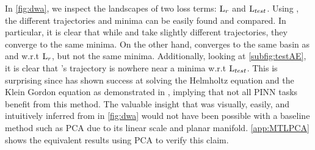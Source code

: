\documentclass[letterpaper]{article} %
\begin{document}
        In \cref{fig:dwa}, we inspect the landscapes of two loss terms: $\text{L}_{r}$ and $\text{L}_{test}$. 
        Using \proposedautencoder{}, 
        the different trajectories and minima can be easily found and compared. In particular, it is clear that while \gradnorm{} and \ew{} take slightly different trajectories, they converge to the same minima. On the other hand, \dwa{} converges to the same basin as \gradnorm{} and \ew{} w.r.t $\text{L}_{r}$, but not the same minima.  
        Additionally, looking at \cref{subfig:testAE}, it is clear that \lranneal{}'s trajectory is nowhere near a minima w.r.t $\text{L}_{test}$. This is surprising since \lranneal{} has shown success at solving the Helmholtz equation and the Klein Gordon equation as demonstrated in \cite{doi:10.1137/20M1318043}, implying that not all PINN tasks benefit from this method. %
        The valuable insight that was visually, easily, and intuitively inferred from \proposedautencoder{} in \cref{fig:dwa} would not have been possible with a baseline method such as PCA due to its linear scale and planar manifold. \cref{app:MTLPCA} shows the equivalent results using PCA to verify this claim. 
        
\end{document}
